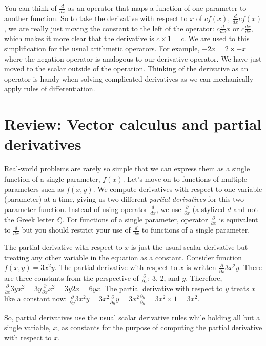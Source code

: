 \documentclass[11pt]{article}
\begin{document}
You can think of $\frac{d}{dx}$ as an operator that maps a function of one parameter to another function. So to take the derivative with respect to $x$ of $cf(x)$, $\frac{d}{dx} cf(x)$, we are really just moving the constant to the left of the operator: $c\frac{d}{dx}x$ or $c\frac{dx}{dx}$, which makes it more clear that the derivative is $c \times 1 = c$.  We are used to this simplification for the usual arithmetic operators. For example, $-2x = 2 \times -x$ where the negation operator is analogous to our derivative operator. We have just moved to the scalar outside of the operation. Thinking of the derivative as an operator is handy when solving complicated derivatives as we can mechanically apply rules of differentiation.

\section{Review: Vector calculus and partial derivatives}

Real-world problems are rarely so simple that we can express them as a single function of a single parameter, $f(x)$. Let's move on to functions of multiple parameters such as $f(x,y)$. We compute derivatives with respect to one variable (parameter) at a time, giving us two different {\em partial derivatives} for this two-parameter function.  Instead of using operator $\frac{d}{dx}$, we use $\frac{\partial}{\partial x}$ (a stylized $d$ and not the Greek letter $\delta$). For functions of a single parameter, operator $\frac{\partial}{\partial x}$ is equivalent to $\frac{d}{dx}$ but you should  restrict your use of $\frac{d}{dx}$ to functions of a single parameter.

The partial derivative with respect to $x$ is just the usual scalar derivative but treating any other variable in the equation as a constant.  Consider function $f(x,y) = 3x^2y$. The partial derivative with respect to $x$ is written $\frac{\partial}{\partial x} 3x^2y$. There are three constants from the perspective of $\frac{\partial}{\partial x}$: 3, 2, and $y$. Therefore, $\frac{\partial}{\partial x} 3yx^2 = 3y\frac{\partial}{\partial x} x^2 = 3y2x = 6yx$. The partial derivative with respect to $y$ treats $x$ like a constant now: $\frac{\partial}{\partial y} 3x^2y = 3x^2\frac{\partial}{\partial y} y = 3x^2\frac{\partial y}{\partial y} = 3x^2 \times 1 = 3x^2$. 

So, partial derivatives use the usual scalar derivative rules while holding all but a single variable, $x$, as constants for the purpose of computing the partial derivative with respect to $x$.
\end{document}
